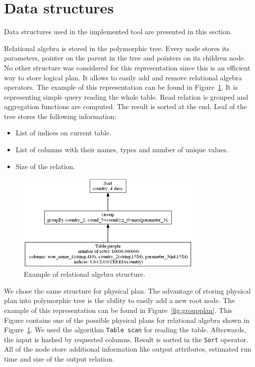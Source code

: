 \section{Data structures}

Data structures used in the implemented tool are presented in this section.

Relational algebra is stored in the polymorphic tree. Every node stores its parameters, pointer on the parent in the tree and pointers on its children node. No other structure was considered for this representation since this is an efficient way to store logical plan. It allows to easily add and remove relational algebra operators.
The example of this representation can be found in Figure~\ref{fig:groupalgebra}. It is representing simple query reading the whole table. Read relation is grouped and aggregation functions are computed. The result is sorted at the end. Leaf of the tree stores the following information:
\begin{itemize}
\item List of indices on current table.
\item List of columns with their names, types and number of unique values.
\item Size of the relation.
\end{itemize}
\begin{figure}[h!]
  \centering
    \includegraphics[width=0.8\textwidth]{groupalgebra}

      \caption{Example of relational algebra structure.}
          \label{fig:groupalgebra}
\end{figure}

We chose the same structure for physical plan. The advantage of storing physical plan into polymorphic tree is the ability to easily add a new root node. The example of this representation can be found in Figure~\ref{fig:groupplan}. This Figure contains one of the possible physical plans for relational algebra shown in Figure~\ref{fig:groupalgebra}. We used the algorithm \texttt{Table scan} for reading the table. Afterwards, the input is hashed by requested columns. Result is sorted in the \texttt{Sort} operator. All of the node store additional information like output attributes, estimated run time and size of the output relation.

